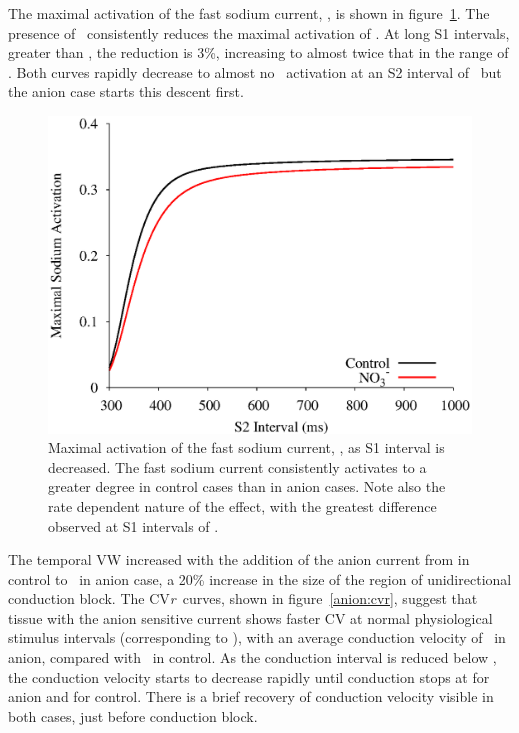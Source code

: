 The maximal activation of the fast sodium current, , is shown in
figure~\ref{anion:ina}.  The presence of \ consistently reduces the
maximal activation of .  At long S1 intervals, greater than , the
reduction is 3\%, increasing to almost twice that in the range of
.  Both curves rapidly decrease to almost no \
activation at an S2 interval of \ but the anion case starts this descent
first.

\begin{figure}
\includegraphics{figures/toolkit/anion/08_INa}
\caption[Anion Sensitive maximum activation of the fast sodium current.]{
\label{anion:ina} Maximal activation of the fast sodium current, \ii{Na}, as S1
interval is decreased.  The fast sodium current consistently activates to a
greater degree in control cases than in anion cases.  Note also the rate
dependent nature of the effect, with the greatest difference observed at S1
intervals of \msrange{400}{500}.}
\end{figure}

The temporal VW increased with the addition of the anion current from
\ms{3.20} in
control to \ in anion case, a 20\% increase in the size of the region of
unidirectional conduction block.  The CV\emph{r}\ curves, shown in
figure~\ref{anion:cvr}, suggest that tissue with the anion sensitive current
shows faster CV at normal physiological stimulus intervals (corresponding to
\msrange{500}{1000}), with an average conduction velocity of
\ in anion, compared with \ in control.  As the conduction
interval is reduced below \ms{500}, the conduction velocity starts to decrease
rapidly until conduction stops at \ms{325} for anion and \ms{319} for control.
There is a brief recovery of conduction velocity visible in both cases, just
before conduction block.

